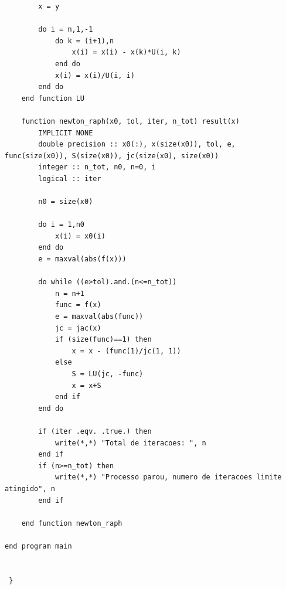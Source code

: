 \documentclass[a4paper, 12pt, openright, oneside]{article}
\begin{document}
\begin{lstlisting}
        x = y

        do i = n,1,-1
            do k = (i+1),n
                x(i) = x(i) - x(k)*U(i, k)
            end do
            x(i) = x(i)/U(i, i)
        end do
    end function LU

    function newton_raph(x0, tol, iter, n_tot) result(x)
        IMPLICIT NONE
        double precision :: x0(:), x(size(x0)), tol, e, func(size(x0)), S(size(x0)), jc(size(x0), size(x0))
        integer :: n_tot, n0, n=0, i
        logical :: iter

        n0 = size(x0)

        do i = 1,n0
            x(i) = x0(i)
        end do
        e = maxval(abs(f(x)))

        do while ((e>tol).and.(n<=n_tot))
            n = n+1
            func = f(x)
            e = maxval(abs(func))
            jc = jac(x)
            if (size(func)==1) then
                x = x - (func(1)/jc(1, 1))
            else
                S = LU(jc, -func)
                x = x+S
            end if
        end do

        if (iter .eqv. .true.) then
            write(*,*) "Total de iteracoes: ", n
        end if
        if (n>=n_tot) then
            write(*,*) "Processo parou, numero de iteracoes limite atingido", n
        end if

    end function newton_raph

end program main


 } \end{lstlisting}
\newpage
\end{document}
